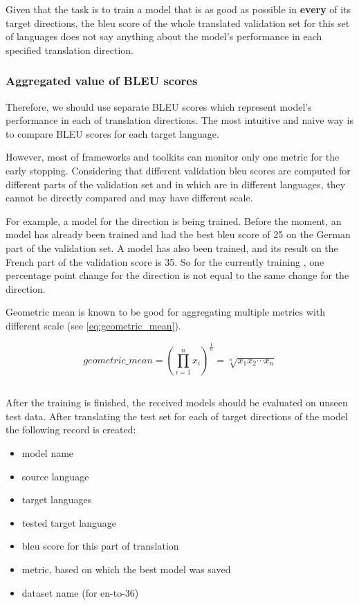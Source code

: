 Given that the task is to train a model that is as good as possible in
\textbf{every} of its target directions, the \acrshort{bleu} score of
the whole translated validation set for this set of languages does not
say anything about the model's performance in each specified
translation direction.

\subsubsection*{Aggregated value of BLEU scores}

Therefore, we should use separate BLEU scores which represent
model's performance in each of translation directions.
The most intuitive and naive way is to compare BLEU scores
for each target language.

However, most of frameworks and toolkits can monitor only one metric
for the early stopping.
Considering that different validation \acrshort{bleu} scores
are computed for different parts of the validation set and in
which are in different languages, they cannot be directly compared
and may have different scale.

For example, a model for the  direction is being
trained.
Before the moment, an  model has already been trained and
had the best \acrshort{bleu} score of 25 on the German part of the
validation set.
A  model has also been trained, and its result on the
French part of the validation score is 35.
So for the currently training , one percentage point
change for the  direction is not equal to the same change for the
 direction.

Geometric mean is known to be good for aggregating multiple metrics
with different scale (see \cref{eq:geometric_mean}).

\begin{equation}
\label{eq:geometric_mean}
	geometric\_mean = \left(\prod _{i=1}^{n}x_{i}\right)^{\frac {1}{n}}={\sqrt[{n}]{x_{1}x_{2}\cdots x_{n}}}
\end{equation}

\subsection{}
\label{subsection:testing}

After the training is finished, the received models should be evaluated on unseen
test data.
After translating the test set for each of target directions of the model
the following record is created:
\begin{itemize}
	\item model name
	\item source language
	\item target languages
	\item tested target language
	\item \acrshort{bleu} score for this part of translation
	\item metric, based on which the best model was saved
	\item dataset name (for \gls{en-to-36})
\end{itemize}

